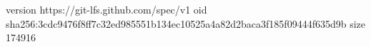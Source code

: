 version https://git-lfs.github.com/spec/v1
oid sha256:3cdc9476f8ff7c32ed985551b134ec10525a4a82d2baca3f185f09444f635d9b
size 174916
